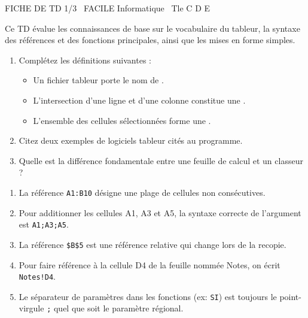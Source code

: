 \documentclass[11pt]{article}
\begin{document}
\begin{tcolorbox}[enhanced,colback=popink,colframe=popink,arc=10pt,boxrule=0pt,left=12pt,right=12pt,top=9pt,bottom=9pt]
{\color{white}\popxbold\small FICHE DE TD 1/3 \textbullet\ FACILE \hfill Informatique \textbullet\ Tle C D E\par}
\end{tcolorbox}
\vspace{4pt}
Ce TD évalue les connaissances de base sur le vocabulaire du tableur, la syntaxe des références et des fonctions principales, ainsi que les mises en forme simples.

\begin{exercice}
\begin{enumerate}
    \item Complétez les définitions suivantes :
    \begin{itemize}
        \item Un fichier tableur porte le nom de \underline{\hspace{5cm}}.
        \item L'intersection d'une ligne et d'une colonne constitue une \underline{\hspace{5cm}}.
        \item L'ensemble des cellules sélectionnées forme une \underline{\hspace{5cm}}.
    \end{itemize}
    \item Citez deux exemples de logiciels tableur cités au programme.
    \item Quelle est la différence fondamentale entre une \og{}feuille de calcul\fg{} et un \og{}classeur\fg{} ?
\end{enumerate}
\end{exercice}

\begin{exercice}
\begin{enumerate}
    \item La référence \texttt{A1:B10} désigne une plage de cellules non consécutives.
    \item Pour additionner les cellules A1, A3 et A5, la syntaxe correcte de l'argument est \texttt{A1;A3;A5}.
    \item La référence \texttt{\$B\$5} est une référence relative qui change lors de la recopie.
    \item Pour faire référence à la cellule D4 de la feuille nommée \og{}Notes\fg{}, on écrit \texttt{Notes!D4}.
    \item Le séparateur de paramètres dans les fonctions (ex: \texttt{SI}) est toujours le point-virgule \texttt{;} quel que soit le paramètre régional.
\end{enumerate}
\end{exercice}
\end{document}
